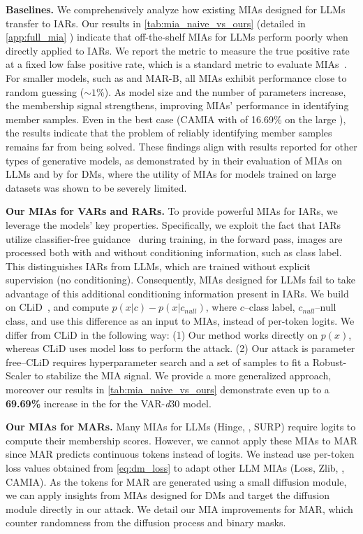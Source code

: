 \textbf{Baselines.} We comprehensively analyze how existing MIAs designed for LLMs transfer to IARs. Our results in \cref{tab:mia_naive_vs_ours} (detailed in \cref{app:full_mia}
) indicate that off-the-shelf MIAs for LLMs perform poorly when directly applied to IARs. 
We report the \tprat metric to measure the true positive rate at a fixed low false positive rate, which is a standard metric to evaluate MIAs~\citep{carlini2022lira}. For smaller models, such as \varsmall and MAR-B, all MIAs exhibit performance close to random guessing ($\sim1\%$). %
As model size and the number of parameters increase, the membership signal strengthens, improving MIAs' performance in identifying member samples. Even in the best case (CAMIA with \tprat of 16.69\% on the large {\varbig}), the results indicate that the problem of reliably identifying member samples remains far from being solved.
These findings align with results reported for other types of generative models, as demonstrated by \citet{maini2024llmdatasetinferencedid,zhang2024membership,duan2024membership} in their evaluation of MIAs on LLMs and by \citep{dubinski2024towards,zhai2024clid} for DMs, where the utility of MIAs for models trained on large datasets was shown to be severely limited.

\textbf{Our MIAs for VARs and RARs.} To provide powerful MIAs for IARs, we leverage the models' key properties. Specifically, we exploit the fact that IARs utilize classifier-free guidance~\citep{ho2022classifier} during training, \ie in the forward pass, images are processed both with and without conditioning information, such as class label. This distinguishes IARs from LLMs, which are trained without explicit supervision (no conditioning). Consequently, MIAs designed for LLMs fail to take advantage of this additional conditioning information present in IARs. We build on CLiD~\citep{zhai2024clid}, and compute $p(x|c)-p(x|c_{null})$, where $c$--class label, $c_{null}$--null class, and use this difference as an input to MIAs, instead of per-token logits. We differ from CLiD in the following way: (1) Our method works directly on $p(x)$, whereas CLiD uses model loss to perform the attack. (2) Our attack is parameter free--CLiD requires hyperparameter search and a set of samples to fit a Robust-Scaler to stabilize the MIA signal. We provide a more generalized approach, moreover our results in \cref{tab:mia_naive_vs_ours} demonstrate even up to a \textbf{69.69\%} increase in the \tprat for the VAR-\textit{d}30 model.

\textbf{Our MIAs for MARs.} Many MIAs for LLMs (Hinge, \minkpp, SURP) require logits to compute their membership scores. However, we cannot apply these MIAs to MAR since MAR predicts continuous tokens instead of logits. We instead use per-token loss values obtained from \cref{eq:dm_loss} to adapt other LLM MIAs (Loss, Zlib, \mink, CAMIA). 
As the tokens for MAR are generated using a small diffusion module, we can apply insights from MIAs designed for DMs and target the diffusion module directly in our attack. We detail our MIA improvements for MAR, which counter randomness from the diffusion process and binary masks.






